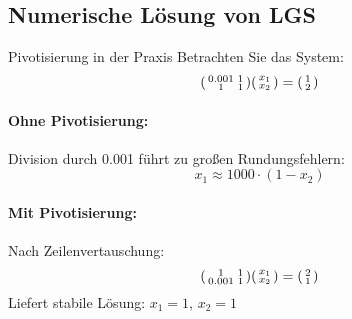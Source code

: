 \subsection{Numerische Lösung von LGS}

\begin{example2}{Pivotisierung in der Praxis}
Betrachten Sie das System:
$$\begin{psmallmatrix}
0.001 & 1\\
1 & 1
\end{psmallmatrix}
\begin{psmallmatrix}
x_1\\
x_2
\end{psmallmatrix} = 
\begin{psmallmatrix}
1\\
2
\end{psmallmatrix}$$

\paragraph{Ohne Pivotisierung:}
Division durch 0.001 führt zu großen Rundungsfehlern:
$$x_1 \approx 1000 \cdot (1 - x_2)$$

\paragraph{Mit Pivotisierung:}
Nach Zeilenvertauschung:
$$\begin{psmallmatrix}
1 & 1\\
0.001 & 1
\end{psmallmatrix}
\begin{psmallmatrix}
x_1\\
x_2
\end{psmallmatrix} = 
\begin{psmallmatrix}
2\\
1
\end{psmallmatrix}$$
Liefert stabile Lösung: $x_1 = 1$, $x_2 = 1$
\end{example2}

